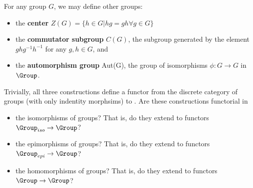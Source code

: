 \documentclass[main.tex]{subfiles}
\begin{document}
\begin{exercise}
For any group $G$, we may define other groups: 
\begin{itemize}
    \item the \textbf{center} $Z(G) = \{h \in G | hg = gh \forall g\in G\}$
    \item the \textbf{commutator subgroup} $C(G)$, the subgroup generated by the element $ghg^{-1}h^{-1}$ for any $g,h \in G$, and
    \item the \textbf{automorphism group} Aut(G), the group of isomorphisms $\phi: G \rightarrow G$ in $\Group$.
\end{itemize}
Trivially, all three constructions define a functor from the discrete category of groups (with only indentity morphsims) to \Group. Are these constructions functorial in 
\begin{itemize}
    \item the isomorphisms of groups? That is, do they extend to functors $\Group_{iso} \rightarrow \Group$?
    \item the epimorphisms of groups? That is, do they extend to functors $\Group_{epi} \rightarrow \Group$?
    \item the homomorphisms of groups? That is, do they extend to functors $\Group \rightarrow \Group$?
\end{itemize}
\end{exercise}
\end{document}
